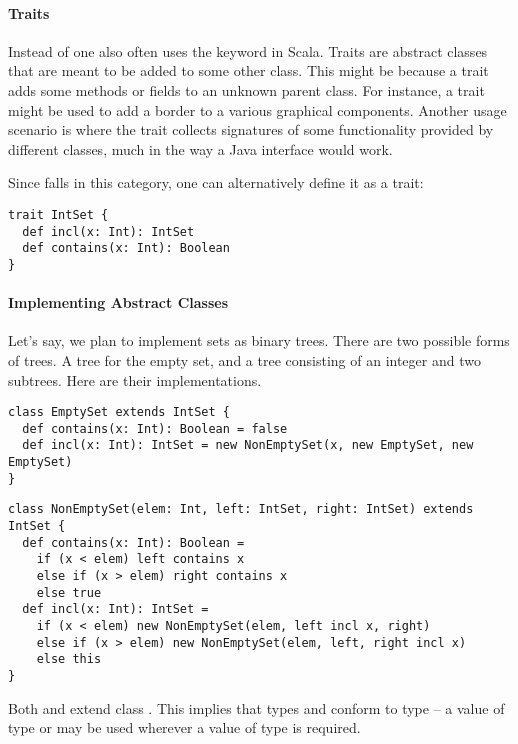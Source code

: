 \paragraph{Traits}

Instead of  one also often uses the keyword
 in Scala. Traits are abstract classes that are meant to
be added to some other class. This might be because a trait adds some
methods or fields to an unknown parent class.  For instance, a trait
 might be used to add a border to a various graphical
components. Another usage scenario is where the trait collects
signatures of some functionality provided by different classes, much
in the way a Java interface would work.

Since  falls in this category, one can alternatively
define it as a trait:
\begin{lstlisting}
trait IntSet {
  def incl(x: Int): IntSet
  def contains(x: Int): Boolean
}
\end{lstlisting}

\paragraph{Implementing Abstract Classes}

Let's say, we plan to implement sets as binary trees.  There are two
possible forms of trees. A tree for the empty set, and a tree
consisting of an integer and two subtrees. Here are their
implementations.

\begin{lstlisting}
class EmptySet extends IntSet {
  def contains(x: Int): Boolean = false
  def incl(x: Int): IntSet = new NonEmptySet(x, new EmptySet, new EmptySet)
}
\end{lstlisting}

\begin{lstlisting}
class NonEmptySet(elem: Int, left: IntSet, right: IntSet) extends IntSet {
  def contains(x: Int): Boolean =
    if (x < elem) left contains x
    else if (x > elem) right contains x
    else true
  def incl(x: Int): IntSet =
    if (x < elem) new NonEmptySet(elem, left incl x, right)
    else if (x > elem) new NonEmptySet(elem, left, right incl x)
    else this
}
\end{lstlisting}
Both  and  extend class
.  This implies that types  and
 conform to type  -- a value of type  or  may be used wherever a value of type  is required.

